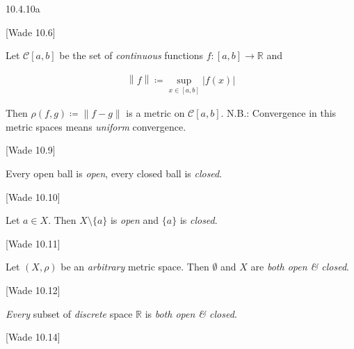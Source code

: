 \documentclass[10pt]{article} %
\newcommand{\cw}[1]{[Wade #1]}
\newcommand{\norm}[1]{\left\lVert#1\right\rVert}
\begin{document}
\begin{multicols}{3}
\begin{exercise}{10.4.10a}{}
\end{exercise}

\begin{example}{\cw{10.6}}{}

    Let $\mathcal{C}[a,b]$ be the set of \emph{continuous} functions $f: [a,b] \to \mathbb{R}$ and

        \begin{align*}
            \norm{f} \coloneqq \sup_{x \in [a,b]} |f(x)|
        \end{align*}

    Then $\rho(f,g) \coloneqq \norm{f - g}$ is a metric on $\mathcal{C}[a,b]$. N.B.: Convergence in this metric spaces means \emph{uniform} convergence.

\end{example}

\begin{remark}{\cw{10.9}}{}

    Every open ball is \emph{open}, every closed ball is \emph{closed}.

\end{remark}

\begin{remark}{\cw{10.10}}{}

    Let $a \in X$. Then $X \setminus \{a\}$ is \emph{open} and $\{a\}$ is \emph{closed}.

\end{remark}

\begin{remark}{\cw{10.11}}{}

    Let $(X,\rho)$ be an \emph{arbitrary} metric space. Then $\emptyset$ and $X$ are \emph{both open \& closed}.

\end{remark}

\begin{example}{\cw{10.12}}{}

    \emph{Every} subset of \emph{discrete} space $\mathbb{R}$ is \emph{both open \& closed}.

\end{example}

\begin{theorem}{\cw{10.14}}{}


\end{theorem}
\end{multicols}
\end{document}
